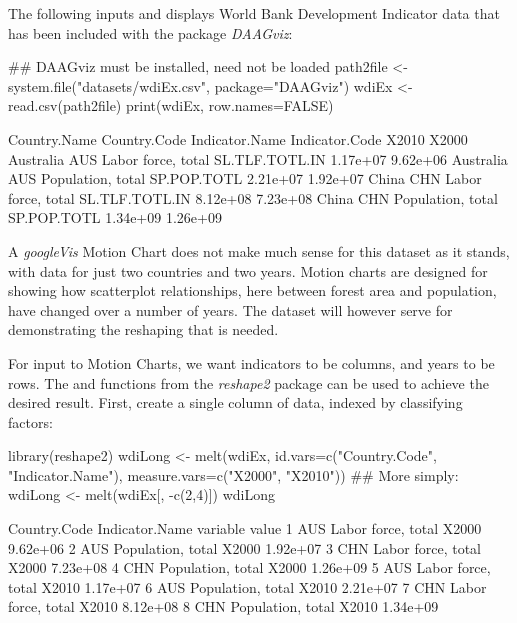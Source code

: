 The following inputs and displays World Bank Development Indicator
data that has been included with the package {\em DAAGviz}:
\begin{fullwidth}
\small
\begin{Schunk}
\begin{Sinput}
## DAAGviz must be installed, need not be loaded
path2file <- system.file("datasets/wdiEx.csv", package="DAAGviz")
wdiEx <- read.csv(path2file)
print(wdiEx, row.names=FALSE)
\end{Sinput}
\begin{Soutput}
 Country.Name Country.Code     Indicator.Name Indicator.Code    X2010    X2000
    Australia          AUS Labor force, total SL.TLF.TOTL.IN 1.17e+07 9.62e+06
    Australia          AUS  Population, total    SP.POP.TOTL 2.21e+07 1.92e+07
        China          CHN Labor force, total SL.TLF.TOTL.IN 8.12e+08 7.23e+08
        China          CHN  Population, total    SP.POP.TOTL 1.34e+09 1.26e+09
\end{Soutput}
\end{Schunk}
\end{fullwidth}

A {\em googleVis} Motion Chart does not make much sense for this
dataset as it stands, with data for just two countries and two years.
Motion charts are designed for showing how scatterplot relationships,
here between forest area and population, have changed over a number of
years.  The dataset will however serve for demonstrating the reshaping
that is needed.

For input to Motion Charts, we want indicators to be
columns, and years to be rows.  The  and
  functions from the {\em reshape2}
  package can be used to achieve the desired result.  First, create a
  single column of data, indexed by classifying factors:
\begin{fullwidth}

\begin{Schunk}
\begin{Sinput}
library(reshape2)
wdiLong <- melt(wdiEx, id.vars=c("Country.Code",
                "Indicator.Name"),
                measure.vars=c("X2000", "X2010"))
## More simply: wdiLong <- melt(wdiEx[, -c(2,4)])
wdiLong
\end{Sinput}
\begin{Soutput}
  Country.Code     Indicator.Name variable    value
1          AUS Labor force, total    X2000 9.62e+06
2          AUS  Population, total    X2000 1.92e+07
3          CHN Labor force, total    X2000 7.23e+08
4          CHN  Population, total    X2000 1.26e+09
5          AUS Labor force, total    X2010 1.17e+07
6          AUS  Population, total    X2010 2.21e+07
7          CHN Labor force, total    X2010 8.12e+08
8          CHN  Population, total    X2010 1.34e+09
\end{Soutput}
\end{Schunk}

\end{fullwidth}

